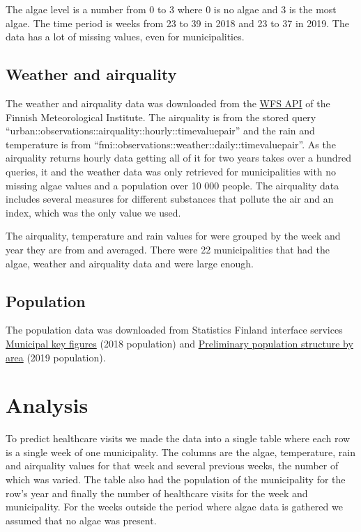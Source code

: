 \documentclass[a4paper, 12pt, english]{article}
\begin{document}
The algae level is a number from 0 to 3 where 0 is no algae
and 3 is the most algae. The time period is weeks from 23 to 39
in 2018 and 23 to 37 in 2019.
The data has a lot of missing values, even for municipalities.

\subsection{Weather and airquality}
The weather and airquality data was downloaded from the
\href{https://ilmatieteenlaitos.fi/tallennetut-kyselyt}{WFS API}
of the Finnish Meteorological Institute.
The airquality is from the stored query
\mbox{``urban::observations::airquality::hourly::timevaluepair''}
and the rain and temperature is from
\mbox{``fmi::observations::weather::daily::timevaluepair''}.
As the airquality returns hourly data getting all of it
for two years takes over a hundred queries,
it and the weather data was only retrieved for
municipalities with no missing algae values and
a population over 10 000 people. The airquality data includes
several measures for different substances that
pollute the air and an index, which was the only value
we used.

The airquality, temperature and rain values for were
grouped by the week and year they are from and
averaged. There were 22 municipalities that had the
algae, weather and airquality data and were large
enough.

\subsection{Population}
The population data was downloaded from Statistics Finland interface services
\href{https://pxnet2.stat.fi/PXWeb/pxweb/en/Kuntien_avainluvut/Kuntien_avainluvut__2019/kuntien_avainluvut_2019_aikasarja.px/table/tableViewLayout1/?rxid=444223df-f91c-4479-891f-5dcd50b983d2}
{Municipal key figures} (2018 population) and
\href{http://pxnet2.stat.fi/PXWeb/pxweb/fi/StatFin/StatFin__vrm__vamuu/statfin_vamuu_pxt_11lj.px/table/tableViewLayout1/}{Preliminary population structure by area} (2019 population).

\section{Analysis}
To predict healthcare visits we made the data into a
single table where each row is a single week of one
municipality. The columns are the algae, temperature,
rain and airquality values for that week and several
previous weeks, the number of which was varied.
The table also had the population of the municipality
for the row's year and finally the number of healthcare
visits for the week and municipality.
For the weeks outside the period where algae data
is gathered we assumed that no algae was present.
\end{document}
